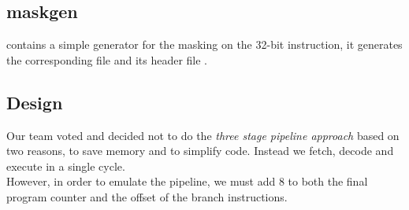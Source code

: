 \documentclass[11pt]{article}
\begin{document}
\subsection{maskgen}
 contains a simple generator for the masking on the 32-bit instruction, it generates the corresponding file  and its header file .

\subsection{Design}
Our team voted and decided not to do the \textit{three stage pipeline approach} based on two reasons, to save memory and to simplify code. Instead we fetch, decode and execute in a single cycle.\\

However, in order to emulate the pipeline, we must add 8 to both the final program counter and the offset of the branch instructions.
\end{document}

